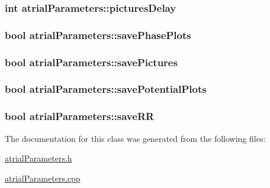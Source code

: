 \hypertarget{classatrial_parameters_a766f0331ef8ecf87beb6e7aa4925bd23}{
\subsubsection[{pictures\+Delay}]{\setlength{\rightskip}{0pt plus 5cm}int atrial\+Parameters\+::pictures\+Delay}}\label{classatrial_parameters_a766f0331ef8ecf87beb6e7aa4925bd23}
\hypertarget{classatrial_parameters_aef1eb255a92bf23d8213830777d589eb}{
\subsubsection[{save\+Phase\+Plots}]{\setlength{\rightskip}{0pt plus 5cm}bool atrial\+Parameters\+::save\+Phase\+Plots}}\label{classatrial_parameters_aef1eb255a92bf23d8213830777d589eb}
\hypertarget{classatrial_parameters_a8ca46db58de6da7fc1c4e850c01c7bba}{
\subsubsection[{save\+Pictures}]{\setlength{\rightskip}{0pt plus 5cm}bool atrial\+Parameters\+::save\+Pictures}}\label{classatrial_parameters_a8ca46db58de6da7fc1c4e850c01c7bba}
\hypertarget{classatrial_parameters_abad2d832645988d1306b41ff0682a468}{
\subsubsection[{save\+Potential\+Plots}]{\setlength{\rightskip}{0pt plus 5cm}bool atrial\+Parameters\+::save\+Potential\+Plots}}\label{classatrial_parameters_abad2d832645988d1306b41ff0682a468}
\hypertarget{classatrial_parameters_af36f1f31c437df63e00b5d0d98afc6a4}{
\subsubsection[{save\+R\+R}]{\setlength{\rightskip}{0pt plus 5cm}bool atrial\+Parameters\+::save\+R\+R}}\label{classatrial_parameters_af36f1f31c437df63e00b5d0d98afc6a4}


The documentation for this class was generated from the following files\+:\begin{DoxyCompactItemize}
\item 
\hyperlink{atrial_parameters_8h}{atrial\+Parameters.\+h}\item 
\hyperlink{atrial_parameters_8cpp}{atrial\+Parameters.\+cpp}\end{DoxyCompactItemize}

